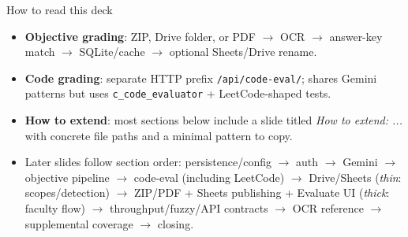 \documentclass[aspectratio=169]{beamer}
\begin{document}
\begin{frame}[t]{How to read this deck}
  \small
  \begin{itemize}
    \item \textbf{Objective grading}: ZIP, Drive folder, or PDF $\rightarrow$ OCR $\rightarrow$ answer-key match $\rightarrow$ SQLite/cache $\rightarrow$ optional Sheets/Drive rename.
    \item \textbf{Code grading}: separate HTTP prefix \texttt{/api/code-eval/}; shares Gemini patterns but uses \texttt{c\_code\_evaluator} + LeetCode-shaped tests.
    \item \textbf{How to extend}: most sections below include a slide titled \textit{How to extend: ...} with concrete file paths and a minimal pattern to copy.
    \item Later slides follow section order: persistence/config $\rightarrow$ auth $\rightarrow$ Gemini $\rightarrow$ objective pipeline $\rightarrow$ code-eval (including LeetCode) $\rightarrow$ Drive/Sheets (\emph{thin}: scopes/detection) $\rightarrow$ ZIP/PDF + Sheets publishing + Evaluate UI (\emph{thick}: faculty flow) $\rightarrow$ throughput/fuzzy/API contracts $\rightarrow$ OCR reference $\rightarrow$ supplemental coverage $\rightarrow$ closing.
  \end{itemize}
\end{frame}
\end{document}
